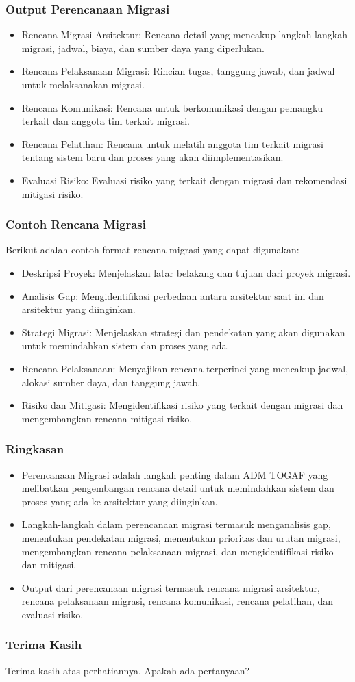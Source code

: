 \documentclass{beamer}
\begin{document}
	\begin{frame}
		\frametitle{Output Perencanaan Migrasi}
		\begin{itemize}
			\item Rencana Migrasi Arsitektur: Rencana detail yang mencakup langkah-langkah migrasi, jadwal, biaya, dan sumber daya yang diperlukan.
			\item Rencana Pelaksanaan Migrasi: Rincian tugas, tanggung jawab, dan jadwal untuk melaksanakan migrasi.
			\item Rencana Komunikasi: Rencana untuk berkomunikasi dengan pemangku terkait dan anggota tim terkait migrasi.
\item Rencana Pelatihan: Rencana untuk melatih anggota tim terkait migrasi tentang sistem baru dan proses yang akan diimplementasikan.
\item Evaluasi Risiko: Evaluasi risiko yang terkait dengan migrasi dan rekomendasi mitigasi risiko.
\end{itemize}
\end{frame}

\begin{frame}
\frametitle{Contoh Rencana Migrasi}
Berikut adalah contoh format rencana migrasi yang dapat digunakan:

\begin{itemize}
\item Deskripsi Proyek: Menjelaskan latar belakang dan tujuan dari proyek migrasi.
\item Analisis Gap: Mengidentifikasi perbedaan antara arsitektur saat ini dan arsitektur yang diinginkan.
\item Strategi Migrasi: Menjelaskan strategi dan pendekatan yang akan digunakan untuk memindahkan sistem dan proses yang ada.
\item Rencana Pelaksanaan: Menyajikan rencana terperinci yang mencakup jadwal, alokasi sumber daya, dan tanggung jawab.
\item Risiko dan Mitigasi: Mengidentifikasi risiko yang terkait dengan migrasi dan mengembangkan rencana mitigasi risiko.
\end{itemize}
\end{frame}

\begin{frame}
\frametitle{Ringkasan}
\begin{itemize}
\item Perencanaan Migrasi adalah langkah penting dalam ADM TOGAF yang melibatkan pengembangan rencana detail untuk memindahkan sistem dan proses yang ada ke arsitektur yang diinginkan.
\item Langkah-langkah dalam perencanaan migrasi termasuk menganalisis gap, menentukan pendekatan migrasi, menentukan prioritas dan urutan migrasi, mengembangkan rencana pelaksanaan migrasi, dan mengidentifikasi risiko dan mitigasi.
\item Output dari perencanaan migrasi termasuk rencana migrasi arsitektur, rencana pelaksanaan migrasi, rencana komunikasi, rencana pelatihan, dan evaluasi risiko.
\end{itemize}
\end{frame}

\begin{frame}
\frametitle{Terima Kasih}
\centering
Terima kasih atas perhatiannya. Apakah ada pertanyaan?
\end{frame}
\end{document}
